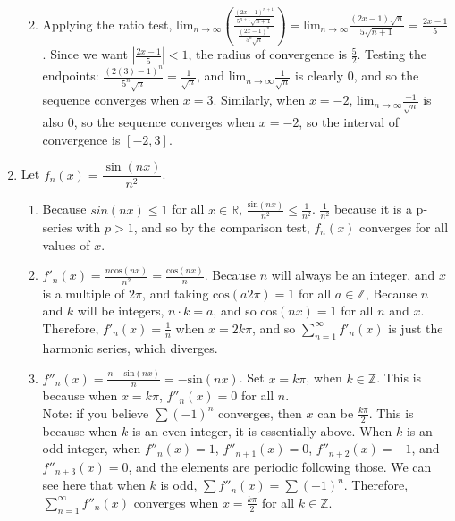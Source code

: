 \documentclass[12pt]{article}
\begin{document}
\begin{enumerate}
\begin{enumerate}
\\
\item Applying the ratio test, lim$_{n\rightarrow\infty}\left(\frac{\frac{(2x-1)^{n+1}}{5^{n+1}\sqrt{n+1}}}{\frac{(2x-1)^n}{5^n\sqrt{n}}}\right) = \text{lim}_{n\rightarrow\infty}\frac{(2x-1)\sqrt{n}}{5\sqrt{n+1}} = \frac{2x-1}{5}$. Since we want $|\frac{2x-1}{5}| < 1$, the radius of convergence is $\frac{5}{2}$. Testing the endpoints: $\frac{(2(3)-1)^n}{5^n\sqrt{n}} = \frac{1}{\sqrt{n}}$, and $\text{lim}_{n\rightarrow\infty}\frac{1}{\sqrt{n}}$ is clearly 0, and so the sequence converges when $ x = 3$. Similarly, when $x = -2$, $\text{lim}_{n\rightarrow\infty}\frac{-1}{\sqrt{n}}$ is also 0, so the sequence converges when $x = -2$, so the interval of convergence is $[-2, 3]$.\\
\end{enumerate}

\pagebreak

\item Let $f_n(x)=\dfrac{\sin(nx)}{n^2}$.  
\begin{enumerate}
\item Because $sin(nx)\leq 1$ for all $x\in\mathbb{R}$, $\frac{\text{sin}(nx)}{n^2}\leq\frac{1}{n^2}$. $\frac{1}{n^2}$ because it is a p-series with $p>1$, and so by the comparison test, $f_n(x)$ converges for all values of $x$.
\\
\item $f'_n(x) = \frac{n\text{cos}(nx)}{n^2} = \frac{\text{cos}(nx)}{n}$. Because $n$ will always be an integer, and $x$ is a multiple of $2\pi$, and taking $\text{cos}(a2\pi)=1$ for all $a\in\mathbb{Z}$, Because $n$ and $k$ will be integers, $n \cdot k = a$, and so cos$(nx)=1$ for all $n$ and $x$. Therefore, $f'_n(x) = \frac{1}{n}$ when $x=2k\pi$, and so $\sum_{n=1}^\infty f'_n(x)$ is just the harmonic series, which diverges.
\\
\item $f''_n(x) = \frac{n-\text{sin}(nx)}{n} = -\text{sin}(nx)$. Set $x=k\pi$, when $k \in \mathbb{Z}$. This is because when \textbf{$x=k\pi$}, $f''_n(x) = 0$ for all $n$. 
\\Note: if you believe $\sum (-1)^n$ converges, then $x$ can be $\frac{k\pi}{2}$. This is because when $k$ is an even integer, it is essentially above. When $k$ is an odd integer, when $f''_n(x) = 1$, $f''_{n+1}(x) = 0$, $f''_{n+2}(x) = -1$, and $f''_{n+3}(x) = 0$, and the elements are periodic following those. We can see here that when $k$ is odd, $\sum f''_{n}(x) = \sum (-1)^n$. Therefore, $\sum_{n=1}^\infty f''_n(x)$ converges when $x = \frac{k\pi}{2}$ for all $k\in\mathbb{Z}$. 


\end{enumerate}
\end{enumerate}
\end{document}
